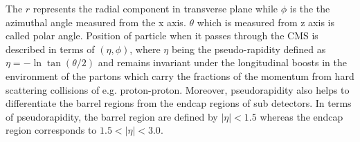 The $r$ represents the radial component in transverse plane while $\phi$ is the the azimuthal angle measured from the x axis. 
$\theta$ which is measured from z axis is called polar angle.
Position of particle when it passes through the CMS is described in terms of $(\eta,\phi)$, where $\eta$ being the pseudo-rapidity defined as  $\eta = -\ln \tan(\theta/2)$ and remains invariant under the longitudinal boosts in the environment of the partons which carry the fractions of the momentum from hard scattering collisions of e.g. proton-proton. 
Moreover, pseudorapidity also helps to differentiate the barrel regions from the endcap regions of sub detectors. In terms of pseudorapidity, the barrel region are defined by 
$|\eta| < 1.5 $ whereas the endcap region corresponds to $1.5 < |\eta| < 3.0$. 
